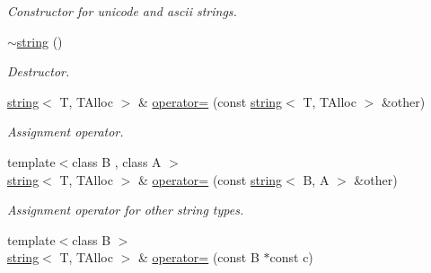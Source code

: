 \begin{DoxyCompactItemize}
\begin{DoxyCompactList}\small\item\em Constructor for unicode and ascii strings. \end{DoxyCompactList}\item 
\hyperlink{classirr_1_1core_1_1string_a03318b653566369a0a192adaebea7c4f}{$\sim$string} ()\hypertarget{classirr_1_1core_1_1string_a03318b653566369a0a192adaebea7c4f}{}\label{classirr_1_1core_1_1string_a03318b653566369a0a192adaebea7c4f}

\begin{DoxyCompactList}\small\item\em Destructor. \end{DoxyCompactList}\item 
\hyperlink{classirr_1_1core_1_1string}{string}$<$ T, T\+Alloc $>$ \& \hyperlink{classirr_1_1core_1_1string_ac2d1635f6ff427d39d2011c3e920d8ed}{operator=} (const \hyperlink{classirr_1_1core_1_1string}{string}$<$ T, T\+Alloc $>$ \&other)\hypertarget{classirr_1_1core_1_1string_ac2d1635f6ff427d39d2011c3e920d8ed}{}\label{classirr_1_1core_1_1string_ac2d1635f6ff427d39d2011c3e920d8ed}

\begin{DoxyCompactList}\small\item\em Assignment operator. \end{DoxyCompactList}\item 
{\footnotesize template$<$class B , class A $>$ }\\\hyperlink{classirr_1_1core_1_1string}{string}$<$ T, T\+Alloc $>$ \& \hyperlink{classirr_1_1core_1_1string_a9f86fc984ed0df4e81fafac3d49fc106}{operator=} (const \hyperlink{classirr_1_1core_1_1string}{string}$<$ B, A $>$ \&other)\hypertarget{classirr_1_1core_1_1string_a9f86fc984ed0df4e81fafac3d49fc106}{}\label{classirr_1_1core_1_1string_a9f86fc984ed0df4e81fafac3d49fc106}

\begin{DoxyCompactList}\small\item\em Assignment operator for other string types. \end{DoxyCompactList}\item 
{\footnotesize template$<$class B $>$ }\\\hyperlink{classirr_1_1core_1_1string}{string}$<$ T, T\+Alloc $>$ \& \hyperlink{classirr_1_1core_1_1string_a3ace0ca7bf1d0156bd317f0acbc9be42}{operator=} (const B $\ast$const c)\hypertarget{classirr_1_1core_1_1string_a3ace0ca7bf1d0156bd317f0acbc9be42}{}\label{classirr_1_1core_1_1string_a3ace0ca7bf1d0156bd317f0acbc9be42}


\end{DoxyCompactItemize}
